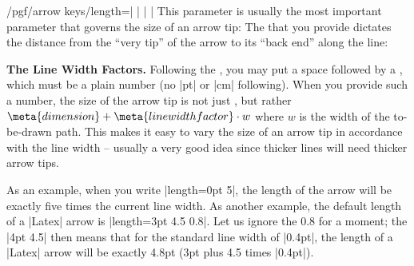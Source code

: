 \begin{key}{/pgf/arrow keys/length=| |%
    | |}
  \label{length-arrow-key}%
  This parameter is usually the most important parameter that governs
  the size of an arrow tip: The  that you provide
  dictates the distance from the ``very tip'' of the arrow to its
  ``back end'' along the line:
\begin{codeexample}[]
\end{codeexample}
\begin{codeexample}[]
\end{codeexample}
\begin{codeexample}[]
\end{codeexample}

  \medskip
  \noindent \textbf{The Line Width Factors.}
  Following the , you may put a space followed by a
  , which must be a plain number (no |pt| or
  |cm| following). When you provide such a number, the size of the
  arrow tip is not just , but rather $\meta{dimension}
  + \meta{line width factor}\cdot w$ where
  $w$ is the width of the to-be-drawn path. This
  makes it easy to vary the size of an arrow tip in accordance with
  the line width -- usually a very good idea since thicker lines will
  need thicker arrow tips. 

  As an example, when you write |length=0pt 5|, the length of the
  arrow will be exactly five times the current line width. As another
  example, the default length of a |Latex| arrow is
  |length=3pt 4.5 0.8|. Let us ignore the 0.8 for a moment; the
  |4pt 4.5| then means that for the standard line width of
  |0.4pt|, the length of a |Latex| arrow will be exactly 4.8pt (3pt
  plus 4.5 times |0.4pt|). 


\end{key}

